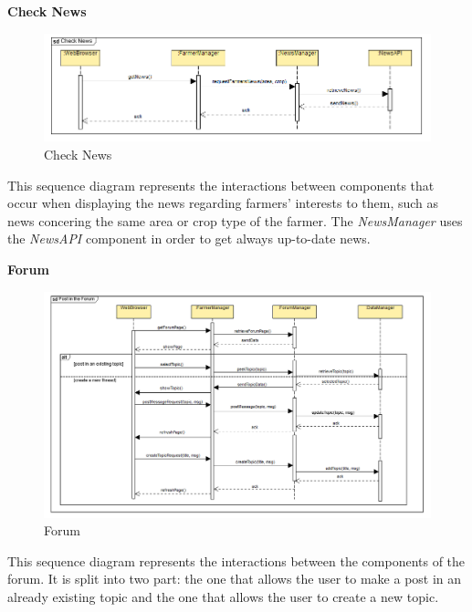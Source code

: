 \documentclass[table, 12pt]{article}
\begin{document}
\newpage
\textbf{Check News}
\begin{center}
    \begin{figure}[H]
        \includegraphics[scale=0.6, center]{assets/SequenceDiagram/CheckNews.png}
        \caption{Check News}
        \label{fig: news}
    \end{figure}
\end{center}
This sequence diagram represents the interactions between components that occur when displaying the news regarding farmers' interests to them, such as news concering the same area or crop type of the farmer.
The \textit{NewsManager} uses the \textit{NewsAPI} component in order to get always up-to-date news.

\newpage
\textbf{Forum}
\begin{center}
    \begin{figure}[H]
        \includegraphics[scale=0.5, center]{assets/SequenceDiagram/PostInTheForum.png}
        \caption{Forum}
        \label{fig: forum}
    \end{figure}
\end{center}
This sequence diagram represents the interactions between the components of the forum. 
It is split into two part: the one that allows the user to make a post in an already existing topic and the one that allows the user to create a new topic.
\end{document}
